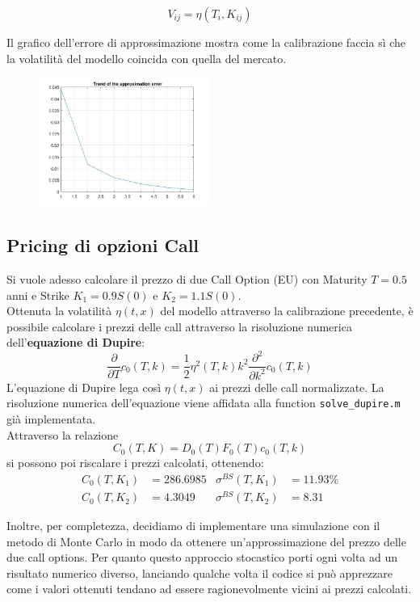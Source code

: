 \documentclass[11pt]{article}
\begin{document}
\begin{equation}
V_{ij} = \eta(T_i,K_{ij})
\end{equation}

Il grafico dell'errore di approssimazione mostra come la calibrazione faccia sì che la volatilità del modello coincida con quella del mercato.

\begin{figure}[H]
\centering
\includegraphics[width=0.5\textwidth]{cal}
\end{figure}

\subsection{Pricing di opzioni Call}
Si vuole adesso calcolare il prezzo di due Call Option (EU) con Maturity $T=0.5$ anni e Strike $K_1 = 0.9 S(0)$ e $K_2 = 1.1S(0)$.\\
Ottenuta la volatilità $\eta(t,x)$ del modello attraverso la calibrazione precedente, è possibile calcolare i prezzi delle call attraverso la risoluzione numerica dell'\textbf{equazione di Dupire}:
\begin{equation}
\frac{\partial}{\partial T}c_0(T,k) = \frac{1}{2}\eta^2(T,k)k^2\frac{\partial^2}{\partial k^2}c_0(T,k)
\end{equation} 
\vspace*{1cm}
L'equazione di Dupire lega così $\eta(t,x)$ ai prezzi delle call normalizzate. La risoluzione numerica dell'equazione viene affidata alla function \texttt{solve\_dupire.m} già implementata.\\
Attraverso la relazione $$C_0(T,K) = D_0(T)F_0(T)c_0(T,k)$$ 
si possono poi riscalare i prezzi calcolati, ottenendo:
\begin{align*}
C_0(T,K_1) &= 286.6985 & \sigma^{BS}(T,K_1) &= 11.93\%\\
C_0(T,K_2) &= 4.3049 & \sigma^{BS}(T,K_2) &= 8.31
\end{align*}

Inoltre, per completezza, decidiamo di implementare una simulazione con il metodo di Monte Carlo in modo da ottenere un'approssimazione del prezzo delle due call options. Per quanto questo approccio stocastico porti ogni volta ad un risultato numerico diverso, lanciando qualche volta il codice si può apprezzare come i valori ottenuti tendano ad essere ragionevolmente vicini ai prezzi calcolati. 
 
\end{document}
